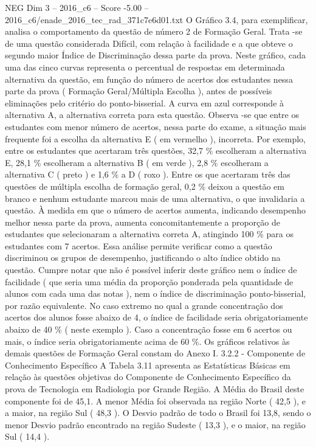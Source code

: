 \begin{textsample}{NEG Dim 3 – 2016\_c6 – Score -5.00 – 2016\_c6/enade\_2016\_tec\_rad\_371c7e6d01.txt}
O Gráfico 3.4, para exemplificar, analisa o comportamento da questão de número 2 de Formação Geral.
Trata -se de uma questão considerada Difícil, com relação à facilidade e a que obteve o segundo maior Índice de Discriminação dessa parte da prova.
Neste gráfico, cada uma das cinco curvas representa o percentual de respostas em determinada alternativa da questão, em função do número de acertos dos estudantes nessa parte da prova ( Formação Geral/Múltipla Escolha ), antes de possíveis eliminações pelo critério do ponto-bisserial.
A curva em azul corresponde à alternativa A, a alternativa correta para esta questão.
Observa -se que entre os estudantes com menor número de acertos, nessa parte do exame, a situação mais frequente foi a escolha da alternativa E ( em vermelho ), incorreta.
Por exemplo, entre os estudantes que acertaram três questões, 32,7 \% escolheram a alternativa E, 28,1 \% escolheram a alternativa B ( em verde ), 2,8 \% escolheram a alternativa C ( preto ) e 1,6 \% a D ( roxo ).
Entre os que acertaram três das questões de múltipla escolha de formação geral, 0,2 \% deixou a questão em branco e nenhum estudante marcou mais de uma alternativa, o que invalidaria a questão.
À medida em que o número de acertos aumenta, indicando desempenho melhor nessa parte da prova, aumenta concomitantemente a proporção de estudantes que selecionaram a alternativa correta A, atingindo 100 \% para os estudantes com 7 acertos.
Essa análise permite verificar como a questão discriminou os grupos de desempenho, justificando o alto índice obtido na questão.
Cumpre notar que não é possível inferir deste gráfico nem o índice de facilidade ( que seria uma média da proporção ponderada pela quantidade de alunos com cada uma das notas ), nem o índice de discriminação ponto-bisserial, por razão equivalente.
No caso extremo no qual a grande concentração dos acertos dos alunos fosse abaixo de 4, o índice de facilidade seria obrigatoriamente abaixo de 40 \% ( neste exemplo ).
Caso a concentração fosse em 6 acertos ou mais, o índice seria obrigatoriamente acima de 60 \%.
Os gráficos relativos às demais questões de Formação Geral constam do Anexo I. 3.2.2 - Componente de Conhecimento Específico A Tabela 3.11 apresenta as Estatísticas Básicas em relação às questões objetivas do Componente de Conhecimento Específico da prova de Tecnologia em Radiologia por Grande Região.
A Média do Brasil deste componente foi de 45,1.
A menor Média foi observada na região Norte ( 42,5 ), e a maior, na região Sul ( 48,3 ).
O Desvio padrão de todo o Brasil foi 13,8, sendo o menor Desvio padrão encontrado na região Sudeste ( 13,3 ), e o maior, na região Sul ( 14,4 ).

\end{textsample}

